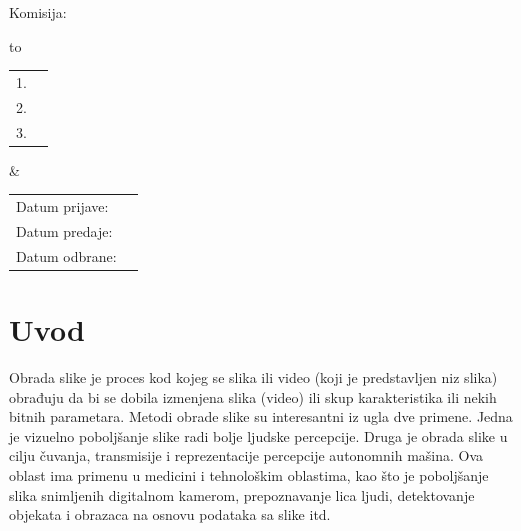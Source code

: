 \documentclass[a4paper,12pt,titlepage]{article}
\begin{document}
\vspace{19cm}

   \noindent
    Komisija:
    
    \vspace{0.1cm}
    
    \noindent
    \begin{tabu} to   
         \begin{tabular}{@{}ll}
            1. & \underline{\hspace{6.5cm}}\\
            2. & \underline{\hspace{6.5cm}}\\
            3. & \underline{\hspace{6.5cm}}
        \end{tabular}  
        
    &
   
        \begin{tabular}{ll@{}}
            Datum prijave: & \underline{\hspace{3cm}}\\
            Datum predaje: & \underline{\hspace{3cm}}\\
            Datum odbrane: & \underline{\hspace{3cm}}
        \end{tabular}
  
    \end{tabu}
    
    \thispagestyle{empty}
    \newpage


\tableofcontents

\setlength{\parskip}{\baselineskip}%
\setlength{\parindent}{15pt}%

\thispagestyle{empty}
\newpage


\section{Uvod}%

Obrada slike je proces kod kojeg se slika ili video (koji je predstavljen niz slika) obrađuju da bi se dobila izmenjena slika (video) ili skup karakteristika ili nekih bitnih parametara. Metodi obrade slike su interesantni iz ugla dve primene. Jedna je vizuelno poboljšanje slike radi bolje ljudske percepcije. Druga je obrada slike u cilju čuvanja, transmisije i reprezentacije percepcije autonomnih mašina. Ova oblast ima primenu u medicini i tehnološkim oblastima, kao što je poboljšanje slika snimljenih digitalnom kamerom, prepoznavanje lica ljudi, detektovanje objekata i obrazaca na osnovu podataka sa slike itd. 
\end{document}

